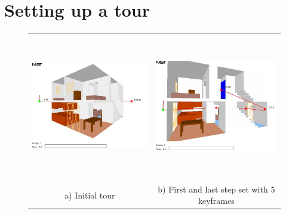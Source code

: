 \documentclass[11pt,twoside]{book}
\newcommand{\figoptions}{hbp}
\newcommand{\figheightA}{2.5in}
\begin{document}
\section{Setting up a tour}
\begin{figure}[\figoptions]
\begin{center}
\begin{tabular}{cc}
\includegraphics[height=\figheightA]{figures/figTOUR_1}&
\includegraphics[height=\figheightA]{figures/figTOUR_2}\\
a) Initial tour&b) First and last step set with 5 keyframes\\

\end{tabular}
\end{center}
\end{figure}
\end{document}
